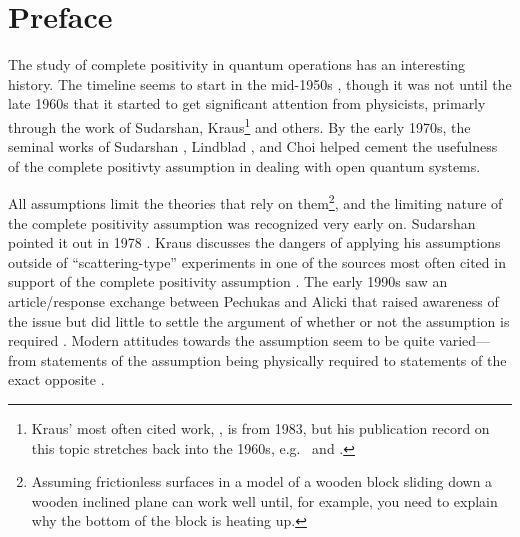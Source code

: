 \newpage
\chapter*{Preface}
The study of complete positivity in quantum operations has an interesting history.  The timeline seems to start in the mid-1950s \cite{Stinespring1955}, though it was not until the late 1960s that it started to get significant attention from physicists, primarly through the work of Sudarshan, Kraus\footnote{Kraus' most often cited work, \cite{Kraus1983}, is from 1983, but his publication record on this topic stretches back into the 1960s, e.g.\ \cite{Kraus1971} and \cite{Kraus1969}.} and others.  By the early 1970s, the seminal works of Sudarshan \cite{Sudarshan1976}, Lindblad \cite{Lindblad1976}, and Choi \cite{Choi1975} helped cement the usefulness of the complete positivty assumption in dealing with open quantum systems.  

All assumptions limit the theories that rely on them\footnote{Assuming frictionless surfaces in a model of a wooden block sliding down a wooden inclined plane can work well until, for example, you need to explain why the bottom of the block is heating up.}, and the limiting nature of the complete positivity assumption was recognized very early on.  Sudarshan pointed it out in 1978 \cite{Sudarshan1978}.  Kraus discusses the dangers of applying his assumptions outside of ``scattering-type'' experiments in one of the sources most often cited in support of the complete positivity assumption \cite{Kraus1983}.  The early 1990s saw an article/response exchange between Pechukas and Alicki that raised awareness of the issue but did little to settle the argument of whether or not the assumption is required \cite{Pechukas1994,Alicki1995,Pechukas1995}.  Modern attitudes towards the assumption seem to be quite varied---from statements of the assumption being physically required \cite{Benatti2005,Alicki2001} to statements of the exact opposite \cite{Sudarshan2005}. 

